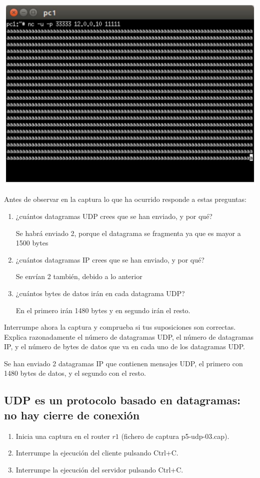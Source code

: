 \documentclass[12pt, a4paper]{report}
\begin{document}
\begin{center}
	\includegraphics[max width=\textwidth]{enunciado2}
\end{center}

Antes de observar en la captura lo que ha ocurrido responde a estas preguntas:

\begin{enumerate}
	\item ¿cuántos datagramas UDP crees que se han enviado, y por qué?
	
	Se habrá enviado 2, porque el datagrama se fragmenta ya que es mayor a 1500 bytes
	
	\item ¿cuántos datagramas IP crees que se han enviado, y por qué?
	
	Se envían 2 también, debido a lo anterior
	
	\item ¿cuántos bytes de datos irán en cada datagrama UDP?
	
	En el primero irán 1480 bytes y en segundo irán el resto.
	
\end{enumerate}

Interrumpe ahora la captura y comprueba si tus suposiciones son correctas. Explica razonadamente el número de datagramas UDP, el número de datagramas IP, y el número de bytes de datos que va en cada uno de los datagramas UDP.

Se han enviado 2 datagramas IP que contienen mensajes UDP, el primero con 1480 bytes de datos, y el segundo con el resto.

\subsection{UDP es un protocolo basado en datagramas: no hay cierre de conexión}
\begin{enumerate}
	\item Inicia una captura en el router $r 1$ (fichero de captura p5-udp-03.cap).
	
	\item Interrumpe la ejecución del cliente pulsando Ctrl+C.
	
	\item Interrumpe la ejecución del servidor pulsando Ctrl+C.
	
\end{enumerate}
\end{document}
